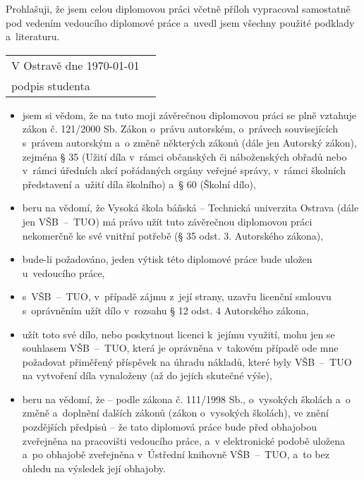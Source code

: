 \documentclass[main.tex]{subfiles}
\begin{document}
\newpage\hbox{}
\vfill
\noindent\large\textbf{}
\bigskip

\normalsize
 Prohlašuji, že jsem celou diplomovou práci včetně příloh vypracoval samostatně pod vedením vedoucího diplomové práce a~uvedl jsem všechny použité podklady a~literaturu.

\vspace{3em}


\begin{tabularx}{\textwidth}{@{}Xl}
V Ostravě dne \today & 
\begin{tabular}[t]{c}
..................................... \\[-10pt]
  podpis studenta
\end{tabular} \\
\end{tabularx}
\clearpage
\noindent\large\textbf{}
\bigskip

\normalsize
\begin{itemize}
\item jsem si vědom, že na tuto moji závěrečnou diplomovou práci se plně vztahuje zákon č. 121/2000 Sb. Zákon o~právu autorském, o~právech souvisejících s~právem autorským a~o změně některých zákonů (dále jen Autorský zákon), zejména § 35 (Užití díla v~rámci občanských či náboženských obřadů nebo v~rámci úředních akcí pořádaných orgány veřejné správy, v~rámci školních představení a~užití díla školního) a~§ 60 (Školní dílo),
\item beru na vědomí, že Vysoká škola báňská -- Technická univerzita Ostrava (dále jen VŠB~--~TUO) má právo užít tuto závěrečnou diplomovou práci nekomerčně ke své vnitřní potřebě (§ 35 odst. 3. Autorského zákona),
\item bude-li požadováno, jeden výtisk této diplomové práce bude uložen u~vedoucího práce,
\item s~VŠB~--~TUO, v~případě zájmu z~její strany, uzavřu licenční smlouvu s~oprávněním užít dílo v~rozsahu § 12 odst. 4 Autorského zákona,
\item užít toto své dílo, nebo poskytnout licenci k~jejímu využití, mohu jen se souhlasem VŠB~--~TUO, která je oprávněna v~takovém případě ode mne požadovat přiměřený příspěvek na úhradu nákladů, které byly VŠB~--~TUO na vytvoření díla vynaloženy (až do jejich skutečné výše),
\item beru na vědomí, že -- podle zákona č. 111/1998 Sb., o~vysokých školách a~o změně a~doplnění dalších zákonů (zákon o~vysokých školách), ve znění pozdějších předpisů -- že tato diplomová práce bude před obhajobou zveřejněna na pracovišti vedoucího práce, a~v elektronické podobě uložena a~po obhajobě zveřejněna v~Ústřední knihovně VŠB~--~TUO, a~to bez ohledu na výsledek její obhajoby.
\end{itemize}
\end{document}
